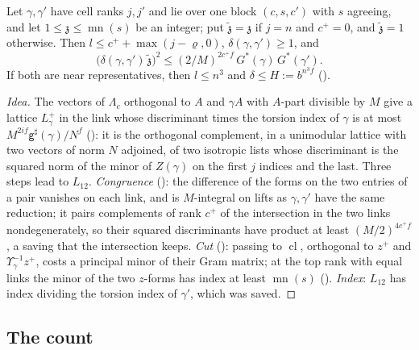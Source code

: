 \begin{proposition}\label{sp-remain:prop:gain}
Let $\gamma,\gamma'$ have cell ranks $j,j'$ and lie over one block $(c,s,c')$ with $s$ agreeing, and
let $1\le\mathfrak z\le\operatorname{mn}(s)$ be an integer; put $\tilde{\mathfrak z}=\mathfrak z$ if $j=n$ and $c^+=0$, and
$\tilde{\mathfrak z}=1$ otherwise. Then $l\le c^++\max(j-\varrho,0)$, $\delta(\gamma,\gamma')\ge1$, and
\[
\bigl(\delta(\gamma,\gamma')\,\tilde{\mathfrak z}\bigr)^2\le(2/M)^{2c^+f}\,G^*(\gamma)\,G^*(\gamma').
\]
If both are near representatives, then $l\le n^3$ and $\delta\le H:=b^{n^3f}$
().
\end{proposition}

\begin{proof}[Idea]
The vectors of $\Lambda_c$ orthogonal to $A$ and $\gamma A$ with $A$-part divisible by $M$ give a
lattice $L^+_\gamma$ in the link whose discriminant times the torsion index of $\gamma$ is at most
$M^{2if}\mathsf g^\sharp(\gamma)/N^f$ (): it is the orthogonal complement, in a
unimodular lattice with two vectors of norm $N$ adjoined, of two isotropic lists whose discriminant
is the squared norm of the minor of $Z(\gamma)$ on the first $j$ indices and the last. Three steps lead to $L_{12}$. \emph{Congruence}
(): the difference of the forms on the two
entries of a pair vanishes on each link, and is $M$-integral on lifts as $\gamma,\gamma'$ have the
same reduction; it pairs complements of rank $c^+$ of the intersection in the two links
nondegenerately, so their squared discriminants have product at least $(M/2)^{4c^+f}$, a saving that
the intersection keeps. \emph{Cut} (): passing to
$\operatorname{cl}$, orthogonal to $z^+$ and $\Upsilon_\gamma^{-1}z^+$, costs a principal minor of
their Gram matrix; at the top rank with equal links the minor of the two $z$-forms has index at least
$\operatorname{mn}(s)$ ().
\emph{Index}: $L_{12}$ has index dividing the torsion index of $\gamma'$, which was saved.
\end{proof}

\subsection{The count}\label{sp-remain:ss:count}

